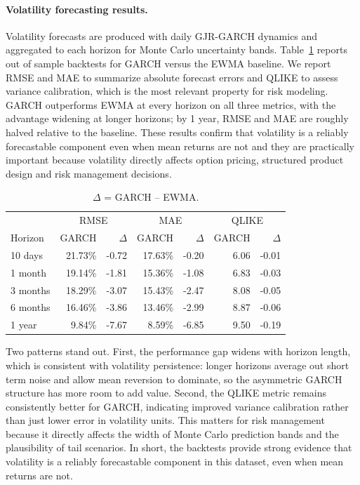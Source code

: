 \documentclass[11pt,a4paper]{article}
\begin{document}
\paragraph{Volatility forecasting results.}
Volatility forecasts are produced with daily GJR-GARCH dynamics and aggregated to each horizon for Monte Carlo uncertainty bands. Table~\ref{tab:volatility} reports out of sample backtests for GARCH versus the EWMA baseline. We report RMSE and MAE to summarize absolute forecast errors and QLIKE to assess variance calibration, which is the most relevant property for risk modeling. GARCH outperforms EWMA at every horizon on all three metrics, with the advantage widening at longer horizons; by 1 year, RMSE and MAE are roughly halved relative to the baseline. These results confirm that volatility is a reliably forecastable component even when mean returns are not and they are practically important because volatility directly affects option pricing, structured product design and risk management decisions.

\begin{table}[H]
\centering
\small
\setlength{\tabcolsep}{4pt}
\renewcommand{\arraystretch}{1.0}
\caption{Volatility backtest (annualized, TSLA).}
\label{tab:volatility}
\begin{tabular}{l r r r r r r}
\toprule
 & \multicolumn{2}{c}{RMSE} & \multicolumn{2}{c}{MAE} & \multicolumn{2}{c}{QLIKE} \\
Horizon & GARCH & $\Delta$ & GARCH & $\Delta$ & GARCH & $\Delta$ \\
\midrule
10 days  & 21.73\% & -0.72 & 17.63\% & -0.20 & 6.06 & -0.01 \\
1 month  & 19.14\% & -1.81 & 15.36\% & -1.08 & 6.83 & -0.03 \\
3 months & 18.29\% & -3.07 & 15.43\% & -2.47 & 8.08 & -0.05 \\
6 months & 16.46\% & -3.86 & 13.46\% & -2.99 & 8.87 & -0.06 \\
1 year   & 9.84\%  & -7.67 & 8.59\%  & -6.85 & 9.50 & -0.19 \\
\bottomrule
\end{tabular}
\caption*{\footnotesize$\Delta$ = GARCH -- EWMA.}
\end{table}

Two patterns stand out. First, the performance gap widens with horizon length, which is consistent with volatility persistence: longer horizons average out short term noise and allow mean reversion to dominate, so the asymmetric GARCH structure has more room to add value. Second, the QLIKE metric remains consistently better for GARCH, indicating improved variance calibration rather than just lower error in volatility units. This matters for risk management because it directly affects the width of Monte Carlo prediction bands and the plausibility of tail scenarios. In short, the backtests provide strong evidence that volatility is a reliably forecastable component in this dataset, even when mean returns are not.
\end{document}
